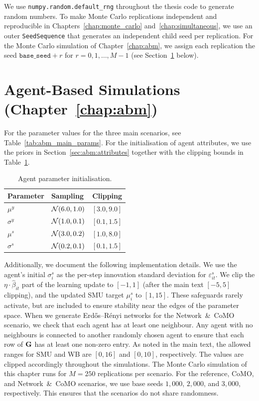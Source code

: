 We use \texttt{numpy.random.default\_rng} throughout the thesis code to generate random numbers. To make Monte Carlo replications independent and reproducible in Chapters~\ref{chap:monte_carlo} and~\ref{chap:simultaneous}, we use an outer \texttt{SeedSequence} that generates an independent child seed per replication. For the Monte Carlo simulation of Chapter~\ref{chap:abm}, we assign each replication the seed $\texttt{base\_seed} + r$ for $r = 0, 1, \ldots, M-1$ (see Section~\ref{app:code:abm} below).

\section{Agent-Based Simulations (Chapter~\ref{chap:abm})}
\label{app:code:abm}
For the parameter values for the three main scenarios, see Table~\ref{tab:abm_main_params}. For the initialisation of agent attributes, we use the priors in Section~\ref{sec:abm:attributes} together with the clipping bounds in Table~\ref{tab:abm_agent_init}.

\begin{table}[htbp]
\centering
\caption[Agent parameter initialisation]{Agent parameter initialisation.}
\label{tab:abm_agent_init}
\begin{tabular}{llc}
\toprule
Parameter & Sampling & Clipping \\
\midrule
$\mu^y$ & $\mathcal{N}(6.0, 1.0)$ & $[3.0, 9.0]$ \\
$\sigma^y$ & $\mathcal{N}(1.0, 0.1)$ & $[0.1, 1.5]$ \\
$\mu^s$ & $\mathcal{N}(3.0, 0.2)$ & $[1.0, 8.0]$ \\
$\sigma^s$ & $\mathcal{N}(0.2, 0.1)$ & $[0.1, 1.5]$ \\
\bottomrule
\end{tabular}
\end{table}

Additionally, we document the following implementation details. We use the agent's initial $\sigma^s_i$ as the per-step innovation standard deviation for $\varepsilon^s_{it}$. We clip the $\eta \cdot \hat{\beta}_{it}$ part of the learning update to $[-1, 1]$ (after the main text $[-5, 5]$ clipping), and the updated SMU target $\mu^s_i$ to $[1, 15]$. These safeguards rarely activate, but are included to ensure stability near the edges of the parameter space. When we generate Erd\H{o}s--R\'enyi networks for the Network~\&~CoMO scenario, we check that each agent has at least one neighbour. Any agent with no neighbours is connected to another randomly chosen agent to ensure that each row of $\mathbf{G}$ has at least one non-zero entry. As noted in the main text, the allowed ranges for SMU and WB are $[0, 16]$ and $[0, 10]$, respectively. The values are clipped accordingly throughout the simulations. The Monte Carlo simulation of this chapter runs for $M = 250$ replications per scenario. For the reference, CoMO, and Network~\&~CoMO scenarios, we use base seeds $1{,}000$, $2{,}000$, and $3{,}000$, respectively. This ensures that the scenarios do not share randomness.

